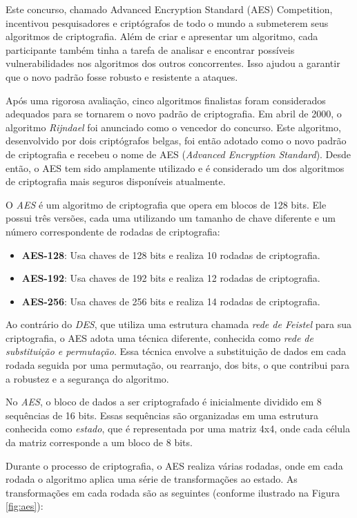 Este concurso, chamado Advanced Encryption Standard (AES) Competition, incentivou pesquisadores e criptógrafos de todo o mundo a submeterem seus algoritmos de criptografia.
Além de criar e apresentar um algoritmo, cada participante também tinha a tarefa de analisar e encontrar possíveis vulnerabilidades nos algoritmos dos outros concorrentes.
Isso ajudou a garantir que o novo padrão fosse robusto e resistente a ataques.

Após uma rigorosa avaliação, cinco algoritmos finalistas foram considerados adequados para se tornarem o novo padrão de criptografia.
Em abril de 2000, o algoritmo {\em Rijndael} foi anunciado como o vencedor do concurso.
Este algoritmo, desenvolvido por dois criptógrafos belgas, foi então adotado como o novo padrão de criptografia e recebeu o nome de AES ({\em Advanced Encryption Standard}).
Desde então, o AES tem sido amplamente utilizado e é considerado um dos algoritmos de criptografia mais seguros disponíveis atualmente.

O \textit{AES} é um algoritmo de criptografia que opera em blocos de 128 bits.
Ele possui três versões, cada uma utilizando um tamanho de chave diferente e um número correspondente de rodadas de criptografia:

\begin{itemize}
    \item \textbf{AES-128}: Usa chaves de 128 bits e realiza 10 rodadas de criptografia.
    \item \textbf{AES-192}: Usa chaves de 192 bits e realiza 12 rodadas de criptografia.
    \item \textbf{AES-256}: Usa chaves de 256 bits e realiza 14 rodadas de criptografia.
\end{itemize}

Ao contrário do \textit{DES}, que utiliza uma estrutura chamada \textit{rede de Feistel} para sua criptografia, o AES adota uma técnica diferente, conhecida como \textit{rede de substituição e permutação}.
Essa técnica envolve a substituição de dados em cada rodada seguida por uma permutação, ou rearranjo, dos bits, o que contribui para a robustez e a segurança do algoritmo.

No \textit{AES}, o bloco de dados a ser criptografado é inicialmente dividido em 8 sequências de 16 bits. Essas sequências são organizadas em uma estrutura conhecida como \textit{estado}, que é representada por uma matriz 4x4, onde cada célula da matriz corresponde a um bloco de 8 bits.

Durante o processo de criptografia, o AES realiza várias rodadas, onde em cada rodada o algoritmo aplica uma série de transformações ao estado.
As transformações em cada rodada são as seguintes (conforme ilustrado na Figura \ref{fig:aes}):

